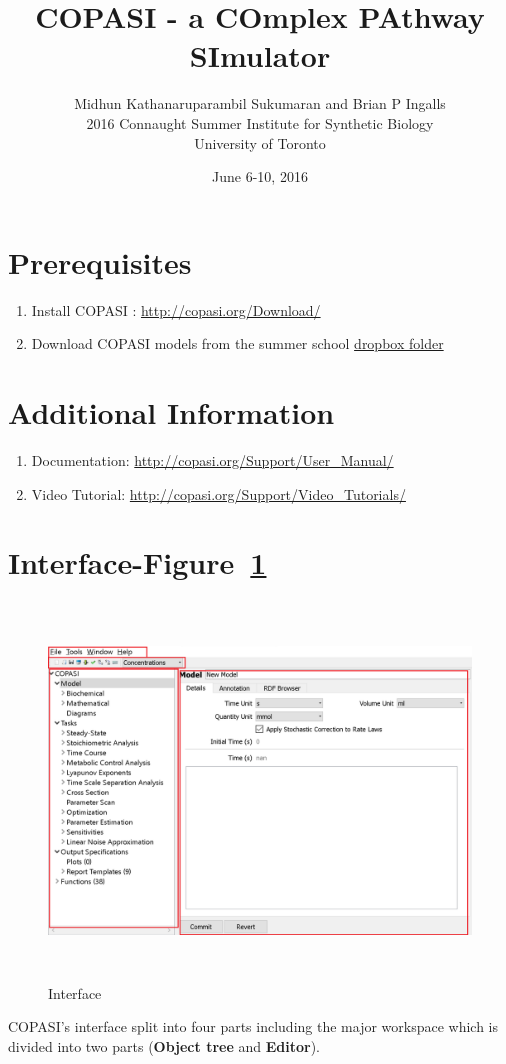 \documentclass[10pt]{article}
\title{\LARGE COPASI - a COmplex PAthway SImulator}
\author{Midhun Kathanaruparambil Sukumaran and Brian P Ingalls\\
	2016 Connaught Summer Institute for Synthetic Biology\\
	University of Toronto}%
\date{June 6-10, 2016}
\theoremstyle{definition}
\theoremstyle{remark}
\begin{document}
	\maketitle    
	\section*{Prerequisites}
	\begin{enumerate}
		\item Install COPASI : \href{http://copasi.org/Download/}{http://copasi.org/Download/}
		\item Download COPASI models from the summer school  \href{https://www.dropbox.com/sh/b2ue0vo0ujyiroc/AADXPVi5s3kFIeVIrPtR29Yaa?dl=0}{dropbox folder}
	\end{enumerate}
	
	\section*{Additional Information}
	\begin{enumerate}
		\item Documentation: \href{http://copasi.org/Support/User_Manual/}{http://copasi.org/Support/User\_Manual/}
		\item Video Tutorial: \href{http://copasi.org/Support/Video_Tutorials/}{http://copasi.org/Support/Video\_Tutorials/}
	\end{enumerate}
	\section{Interface-Figure~\ref{1png}}
	\begin{figure}[h]
		\centering
		\includegraphics[height=10cm]{Images/1.png}
		\caption{Interface}
		\label{1png}
	\end{figure}
	COPASI's interface split into four parts including the major workspace which is divided into two parts (\textbf{Object tree} and \textbf{Editor}).
	
\end{document}
